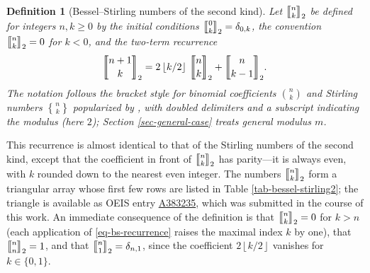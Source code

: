 \documentclass[a4paper]{amsart}
\numberwithin{equation}{section}
\newcommand{\Stirling}[0]{\genfrac\{\}{0pt}{}}
\newcommand{\mStirling}[0]{\genfrac{\llbracket}{\rrbracket}{0pt}{}}
\newcommand{\floor}[1]{\left\lfloor #1 \right\rfloor}
\newtheorem{definition}[theorem]{Definition}
\begin{document}
\begin{definition}[Bessel--Stirling numbers of the second kind]
Let $\mStirling{n}{k}_2$ be defined for integers $n, k \geq 0$ by the initial conditions $\mStirling{0}{k}_2 = \delta_{0,k}$, the convention $\mStirling{n}{k}_2 = 0$ for $k < 0$, and the two-term recurrence
\begin{equation}\label{eq-bs-recurrence}
\mStirling{n+1}{k}_2 = 2\floor{k/2} \, \mStirling{n}{k}_2 + \mStirling{n}{k-1}_2.
\end{equation}
The notation follows the bracket style for binomial coefficients $\binom{n}{k}$ and Stirling numbers $\Stirling{n}{k}$ popularized by \cite{graham_concrete_nodate}, with doubled delimiters and a subscript indicating the modulus (here $2$); Section \ref{sec-general-case} treats general modulus $m$.
\end{definition}

This recurrence is almost identical to that of the Stirling numbers of the second kind, except that the coefficient in front of $\mStirling{n}{k}_2$ has parity---it is always even, with $k$ rounded down to the nearest even integer. The numbers $\mStirling{n}{k}_2$ form a triangular array whose first few rows are listed in Table \ref{tab-bessel-stirling2}; the triangle is available as OEIS entry \href{https://oeis.org/A383235}{A383235}, which was submitted in the course of this work. An immediate consequence of the definition is that $\mStirling{n}{k}_2 = 0$ for $k > n$ (each application of \eqref{eq-bs-recurrence} raises the maximal index $k$ by one), that $\mStirling{n}{n}_2 = 1$, and that $\mStirling{n}{1}_2 = \delta_{n,1}$, since the coefficient $2\floor{k/2}$ vanishes for $k \in \{0, 1\}$.
\end{document}
